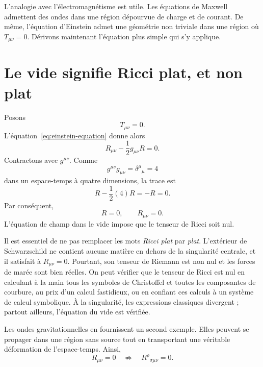 L’analogie avec l’électromagnétisme est utile. Les équations de Maxwell admettent des ondes dans une région dépourvue de charge et de courant. De même, l’équation d’Einstein admet une géométrie non triviale dans une région où \(T_{\mu\nu}=0\). Dérivons maintenant l’équation plus simple qui s’y applique.

\section{Le vide signifie Ricci plat, et non plat}

Posons
\begin{equation}
 T_{\mu\nu}=0.
\end{equation}
L’équation~\eqref{eq:einstein-equation} donne alors
\begin{equation}
 R_{\mu\nu}-\frac12g_{\mu\nu}R=0.
 \label{eq:vacuum-einstein}
\end{equation}
Contractons avec \(g^{\mu\nu}\). Comme
\begin{equation}
 g^{\mu\nu}g_{\mu\nu}
 =\delta^\mu{}_\mu=4
\end{equation}
dans un espace-temps à quatre dimensions, la trace est
\begin{equation}
 R-\frac12(4)R=-R=0.
\end{equation}
Par conséquent,
\begin{equation}
 R=0,
 \qquad
 R_{\mu\nu}=0.
 \label{eq:ricci-flat}
\end{equation}
L’équation de champ dans le vide impose que le tenseur de Ricci soit nul.

Il est essentiel de ne pas remplacer les mots \emph{Ricci plat} par \emph{plat}.
L’extérieur de Schwarzschild ne contient aucune matière en dehors de la singularité centrale, et il satisfait à \(R_{\mu\nu}=0\). Pourtant, son tenseur de Riemann est non nul et les forces de marée sont bien réelles. On peut vérifier que le tenseur de Ricci est nul en calculant à la main tous les symboles de Christoffel et toutes les composantes de courbure, au prix d’un calcul fastidieux, ou en confiant ces calculs à un système de calcul symbolique. À la singularité, les expressions classiques divergent ; partout ailleurs, l’équation du vide est vérifiée.

Les ondes gravitationnelles en fournissent un second exemple. Elles peuvent se propager dans une région sans source tout en transportant une véritable déformation de l’espace-temps. Ainsi,
\begin{equation}
 R_{\mu\nu}=0
 \quad\not\Rightarrow\quad
 R^\rho{}_{\sigma\mu\nu}=0.
\end{equation}

